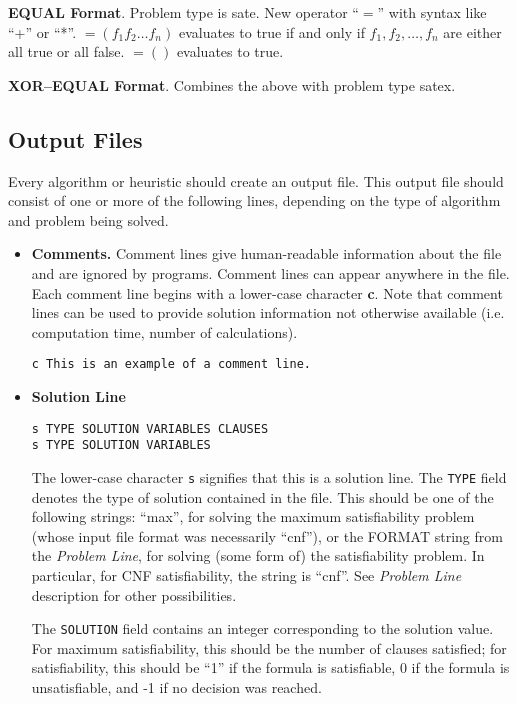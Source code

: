\documentclass[12pt]{article}
\begin{document}
{\bf EQUAL Format}. Problem type is sate.  New operator ``$=$'' with
syntax like ``+'' or ``*''.  $=(f_1 f_2 \ldots f_n)$ evaluates to true
if and only if $f_1,f_2,\ldots,f_n$ are either all true or all false.
$=()$ evaluates to true.

{\bf XOR--EQUAL Format}.  Combines the above with problem type satex.

\subsection{Output Files}
Every algorithm or heuristic should create an output file.  This
output file should consist of one or more of the following lines,
depending on the type of algorithm and problem being solved.

\begin{itemize}

\item {\bf Comments.} Comment lines give human-readable 
information about the file and are ignored by programs.  Comment lines
can appear anywhere in the file.  Each comment line begins with a
lower-case character {\bf c}.  Note that comment lines can be used to
provide solution information not otherwise available (i.e. computation
time, number of calculations).

\begin{verbatim} 
c This is an example of a comment line.
\end{verbatim} 

\item {\bf Solution Line}

\begin{verbatim}
s TYPE SOLUTION VARIABLES CLAUSES
s TYPE SOLUTION VARIABLES
\end{verbatim}
The lower-case character {\tt s} signifies that this is a solution 
line. The {\tt TYPE} field denotes the type of solution contained in
the file.  This should be one of the following strings: ``max'', for
solving the maximum satisfiability problem
(whose input file format was necessarily ``cnf''),
or the FORMAT string from the {\em Problem Line},
for solving (some form of) the satisfiability problem.
In particular, for CNF satisfiability, the string is ``cnf''.
See {\em Problem Line} description for other possibilities.

The {\tt SOLUTION} field contains an integer corresponding
to the solution value.  For maximum satisfiability, this should be the
number of clauses satisfied;  for satisfiability, this should be ``1''
if the formula is satisfiable, 0 if the formula is unsatisfiable,
and -1 if no decision was reached.


\end{itemize}
\end{document}
